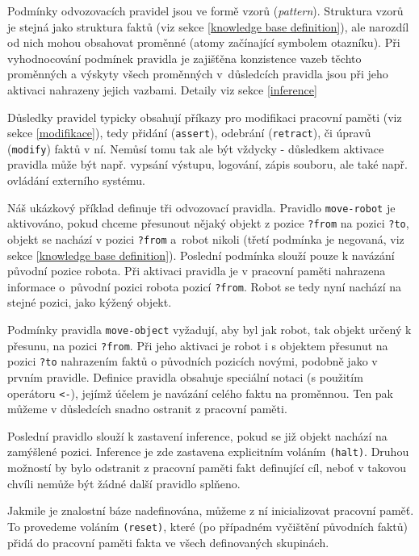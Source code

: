 Podmínky odvozovacích pravidel jsou ve formě vzorů (\emph{pattern}). Struktura
vzorů je stejná jako struktura faktů (viz sekce \ref{knowledge base
definition}), ale narozdíl od nich mohou obsahovat proměnné (atomy začínající
symbolem otazníku).  Při vyhodnocování podmínek pravidla je zajišťěna
konzistence vazeb těchto proměnných a výskyty všech proměnných v~důsledcích
pravidla jsou při jeho aktivaci nahrazeny jejich vazbami. Detaily viz sekce
\ref{inference}

Důsledky pravidel typicky obsahují příkazy pro modifikaci pracovní paměti (viz
sekce \ref{modifikace}), tedy přidání (\verb|assert|), odebrání (\verb|retract|),
či úpravů (\verb|modify|) faktů v ní. Nemůsí
tomu tak ale být vždycky - důsledkem aktivace pravidla může být např. vypsání
výstupu, logování, zápis souboru, ale také např. ovládání externího systému.

Náš ukázkový příklad definuje tři odvozovací pravidla. Pravidlo
\verb|move-robot| je aktivováno, pokud chceme přesunout nějaký objekt z pozice
\verb|?from| na pozici \verb|?to|, objekt se nachází v pozici \verb|?from|
a~robot nikoli (třetí podmínka je negovaná, viz sekce \ref{knowledge base
definition}). Poslední podmínka slouží pouze k navázání původní pozice robota.
Při aktivaci pravidla je v pracovní paměti nahrazena informace o~původní pozici
robota pozicí \verb|?from|. Robot se tedy nyní nachází na stejné pozici, jako
kýžený objekt.

Podmínky pravidla \verb|move-object| vyžadují, aby byl jak robot, tak objekt
určený k přesunu, na pozici \verb|?from|. Při jeho aktivaci je robot i s objektem
přesunut na pozici \verb|?to| nahrazením faktů o původních pozicích novými,
podobně jako v prvním pravidle. Definice pravidla obsahuje speciální notaci (s
použitím operátoru \verb|<-|), jejímž účelem je navázání celého faktu na
proměnnou. Ten pak můžeme v důsledcích snadno ostranit z pracovní paměti.

Poslední pravidlo slouží k zastavení inference, pokud se již objekt nachází na
zamýšlené pozici. Inference je zde zastavena explicitním voláním \verb|(halt)|.
Druhou možností by bylo odstranit z pracovní paměti fakt definující cíl, neboť v
takovou chvíli nemůže být žádné další pravidlo splňeno.

Jakmile je znalostní báze nadefinována, můžeme z ní inicializovat pracovní
paměť. To provedeme voláním \verb|(reset)|, které (po případném vyčištění
původních faktů) přidá do pracovní paměti fakta ve všech definovaných skupinách.

